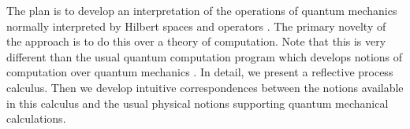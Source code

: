 

The plan is to develop an interpretation of the operations of quantum
mechanics normally interpreted by Hilbert spaces and operators
\cite{MathematicalFoundationsQM}. The primary novelty of the approach
is to do this over a theory of computation. Note that this is very
different than the usual quantum computation program which develops
notions of computation over quantum mechanics \cite{544199}. In
detail, we present a reflective process calculus. Then we develop
intuitive correspondences between the notions available in this
calculus and the usual physical notions supporting quantum mechanical
calculations.

